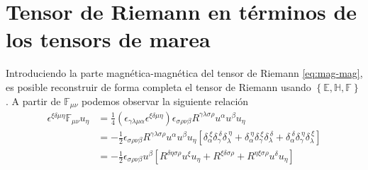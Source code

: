 \chapter{Tensor de Riemann en términos de los tensors de marea}
\label{ape:h}

Introduciendo la parte magnética-magnética del tensor de Riemann \eqref{eq:mag-mag}, es posible reconstruir de forma completa el tensor de Riemann usando $\left\{ \mathbb{E}, \mathbb{H}, \mathbb{F} \right\}$. A partir de $\mathbb{F}_{\mu \nu}$ podemos observar la siguiente relación
\begin{align}
\epsilon^{\xi \delta \mu \eta} \mathbb{F}_{\mu \nu} u_{\eta} &= \frac{1}{4} \left( \epsilon_{\gamma \lambda \mu \alpha} \epsilon^{\xi \delta \mu \eta} \right) \epsilon_{\sigma \rho \nu \beta} R^{\gamma \lambda \sigma \rho} u^{\alpha} u^{\beta} u_{\eta} \nonumber \\
&= -\frac{1}{2} \epsilon_{\sigma \rho \nu \beta} R^{\gamma \lambda \sigma \rho} u^{\alpha} u^{\beta} u_{\eta} \left[  \delta_{\alpha}^{\ \xi} \delta_{\gamma}^{\ \delta} \delta_{\lambda}^{\ \eta} + \delta_{\alpha}^{\ \eta} \delta_{\gamma}^{\ \xi} \delta_{\lambda}^{\ \delta} + \delta_{\alpha}^{\ \delta} \delta_{\gamma}^{\ \eta} \delta_{\lambda}^{\ \xi} \right] \nonumber \\
&= -\frac{1}{2} \epsilon_{\sigma \rho \nu \beta} u^{\beta} \left[ R^{\delta \eta \sigma \rho} u^{\xi} u_{\eta} + R^{\xi \delta \sigma \rho} + R^{\eta \xi \sigma \rho} u^{\delta} u_{\eta}  \right]
\end{align}

